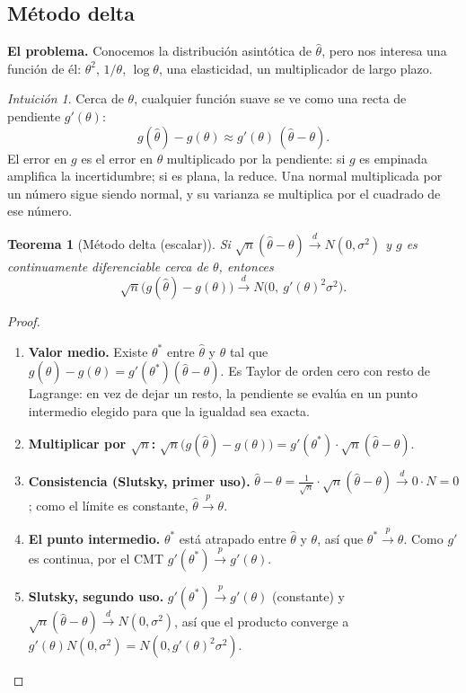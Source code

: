 \documentclass[11pt,a4paper]{article}
\theoremstyle{plain}
\newtheorem{teorema}{Teorema}[section]
\theoremstyle{definition}
\theoremstyle{remark}
\newtheorem*{intuicion}{Intuición}
\newcommand{\cp}{\xrightarrow{\;p\;}}
\newcommand{\cd}{\xrightarrow{\;d\;}}
\begin{document}
\subsection{Método delta}

\textbf{El problema.} Conocemos la distribución asintótica de $\hat\theta$, pero nos interesa
una función de él: $\theta^2$, $1/\theta$, $\log\theta$, una elasticidad, un multiplicador de
largo plazo.

\begin{intuicion}
Cerca de $\theta$, cualquier función suave se ve como una recta de pendiente $g'(\theta)$:
\[
g(\hat\theta)-g(\theta)\approx g'(\theta)\,(\hat\theta-\theta).
\]
El error en $g$ es el error en $\theta$ multiplicado por la pendiente: si $g$ es empinada
amplifica la incertidumbre; si es plana, la reduce. Una normal multiplicada por un número sigue
siendo normal, y su varianza se multiplica por el cuadrado de ese número.
\end{intuicion}

\begin{teorema}[Método delta (escalar)]\label{teo:delta1}
Si $\sqrt n(\hat\theta-\theta)\cd N(0,\sigma^2)$ y $g$ es continuamente diferenciable cerca de
$\theta$, entonces
\[
\sqrt n\big(g(\hat\theta)-g(\theta)\big)\cd N\big(0,\ g'(\theta)^2\sigma^2\big).
\]
\end{teorema}

\begin{proof}
\begin{enumerate}
  \item \textbf{Valor medio.} Existe $\theta^*$ entre $\hat\theta$ y $\theta$ tal que
        $g(\hat\theta)-g(\theta)=g'(\theta^*)(\hat\theta-\theta)$. Es Taylor de orden cero con
        resto de Lagrange: en vez de dejar un resto, la pendiente se evalúa en un punto
        intermedio elegido para que la igualdad sea exacta.
  \item \textbf{Multiplicar por $\sqrt n$:}
        $\sqrt n\big(g(\hat\theta)-g(\theta)\big)=g'(\theta^*)\cdot\sqrt n(\hat\theta-\theta)$.
  \item \textbf{Consistencia (Slutsky, primer uso).}
        $\hat\theta-\theta=\frac1{\sqrt n}\cdot\sqrt n(\hat\theta-\theta)\cd0\cdot N=0$; como el
        límite es constante, $\hat\theta\cp\theta$.
  \item \textbf{El punto intermedio.} $\theta^*$ está atrapado entre $\hat\theta$ y $\theta$, así
        que $\theta^*\cp\theta$. Como $g'$ es continua, por el CMT $g'(\theta^*)\cp g'(\theta)$.
  \item \textbf{Slutsky, segundo uso.} $g'(\theta^*)\cp g'(\theta)$ (constante) y
        $\sqrt n(\hat\theta-\theta)\cd N(0,\sigma^2)$, así que el producto converge a
        $g'(\theta)N(0,\sigma^2)=N(0,g'(\theta)^2\sigma^2)$.
\end{enumerate}
\end{proof}
\end{document}
